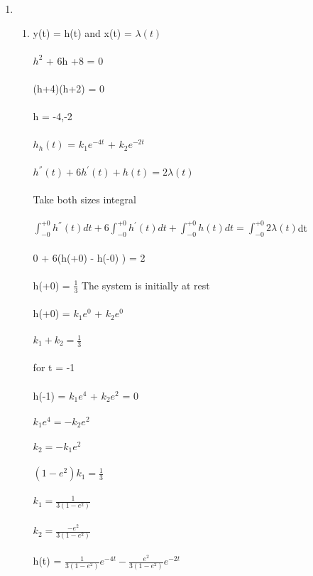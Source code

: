 \documentclass[10pt,a4paper, margin=1in]{article}
\begin{document}
\begin{enumerate}
\begin{enumerate}
        
    
    
 
    \end{enumerate}

\item %
  \begin{enumerate}
    \item %
    y(t) = h(t) and x(t) = $\lambda(t) $\\\\
   $h^{2}$ + 6h +8 = 0\\\\
   (h+4)(h+2) = 0\\\\
   h = -4,-2\\\\
   $h_{h}(t)$ = $k_{1}e^{-4t}$ + $k_{2}e^{-2t}$\\\\
   $h^{''}(t) + 6 h^{'}(t) + h(t) = 2\lambda(t)  $\\\\
   Take both sizes integral \\\\
   $\int_{-0}^{+0}h^{''}(t)dt + 6 \int_{-0}^{+0}h^{'}(t)dt + \int_{-0}^{+0}h(t)dt = \int_{-0}^{+0}2\lambda(t)$dt \\\\
   0 + 6(h(+0) - h(-0) ) = 2 \\\\
   h(+0) = $ \frac{1}{3} $
   The system is initially at rest\\\\
   h(+0) = $k_{1}e^{0}$ + $k_{2}e^{0}$\\\\
   $k_{1} + k_{2} =  \frac{1}{3} $\\\\
   for t = -1\\\\
   h(-1) = $k_{1}e^{4}$ + $k_{2}e^{2}$ = 0\\\\
   $k_{1}e^{4} = -k_{2}e^{2}$  \\\\
   $k_{2} = -k_{1}e^{2}$  \\\\
   $(1-e^{2} )k_{1} =  \frac{1}{3} $\\\\
   $k_{1} =  \frac{1}{3(1-e^{2} )} $\\\\
   $k_{2} =  \frac{-e^{2}}{3(1-e^{2} )} $\\\\
   h(t) = $\frac{1}{3(1-e^{2} )}e^{-4t} - \frac{e^{2}}{3(1-e^{2} )}e^{-2t} $
   

\end{enumerate}
\end{enumerate}
\end{document}
